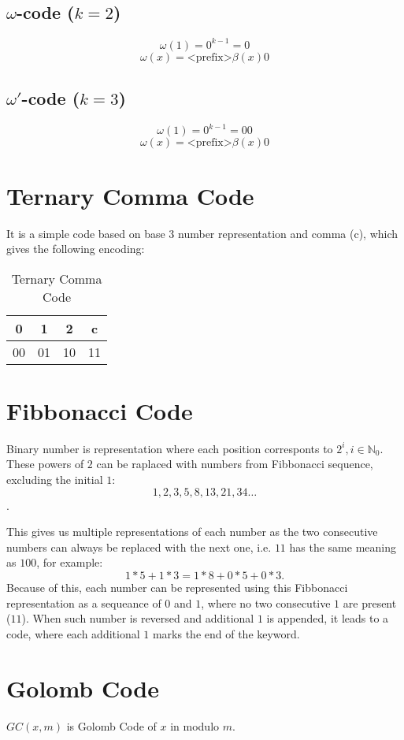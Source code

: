 \subsection{$\omega$-code ($k=2$)}
$$\omega(1) = 0^{k-1} = 0$$
$$\omega(x)= \text{<prefix>}\beta(x)0$$

\subsection{$\omega'$-code ($k=3$)}
$$\omega(1) = 0^{k-1} = 00$$
$$\omega(x)= \text{<prefix>}\beta(x)0$$

\section{Ternary Comma Code}
It is a simple code based on base 3 number representation and comma (c), which gives the following encoding:

\begin{table}
\begin{tabular}{|c|c|c|c|}\hline
    0 & 1 & 2 & c\\\hline
    00 & 01 & 10 & 11\\\hline
\end{tabular}
\caption{Ternary Comma Code}
\end{table}

\section{Fibbonacci Code}
Binary number is representation where each position corresponts to $2^i, i \in \mathbb{N}_0$. These powers of $2$ can be raplaced with numbers from Fibbonacci sequence, excluding the initial $1$:
$$1, 2, 3, 5, 8, 13, 21, 34\ldots$$.

This gives us multiple representations of each number as the two consecutive numbers can always be replaced with the next one, i.e. $11$ has the same meaning as $100$, for example: 
$$1*5+1*3=1*8+0*5+0*3.$$
Because of this, each number can be represented using this Fibbonacci representation as a sequeance of $0$ and $1$, where no two consecutive $1$ are present ($11$). When such number is reversed and additional $1$ is appended, it leads to a code, where each additional $1$ marks the end of the keyword.

\section{Golomb Code}
$GC(x,m)$ is Golomb Code of $x$ in modulo $m$.

